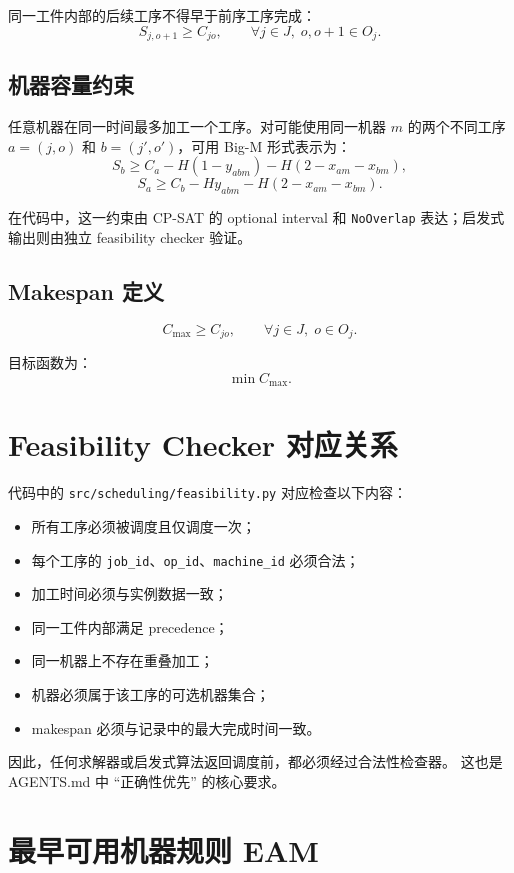 ﻿\documentclass[11pt]{ctexart}
\begin{document}
同一工件内部的后续工序不得早于前序工序完成：
\[
S_{j,o+1} \ge C_{jo},
\qquad \forall j \in J,\; o,o+1 \in O_j.
\]

\subsection{机器容量约束}

任意机器在同一时间最多加工一个工序。对可能使用同一机器 $m$ 的两个不同工序
$a=(j,o)$ 和 $b=(j',o')$，可用 Big-M 形式表示为：
\[
S_b \ge C_a - H(1-y_{abm}) - H(2-x_{am}-x_{bm}),
\]
\[
S_a \ge C_b - Hy_{abm} - H(2-x_{am}-x_{bm}).
\]

在代码中，这一约束由 CP-SAT 的 optional interval 和 \texttt{NoOverlap}
表达；启发式输出则由独立 feasibility checker 验证。

\subsection{Makespan 定义}

\[
C_{\max} \ge C_{jo},
\qquad \forall j \in J,\; o \in O_j.
\]

目标函数为：
\[
\min C_{\max}.
\]

\section{Feasibility Checker 对应关系}

代码中的 \texttt{src/scheduling/feasibility.py} 对应检查以下内容：

\begin{itemize}
  \item 所有工序必须被调度且仅调度一次；
  \item 每个工序的 \texttt{job\_id}、\texttt{op\_id}、\texttt{machine\_id} 必须合法；
  \item 加工时间必须与实例数据一致；
  \item 同一工件内部满足 precedence；
  \item 同一机器上不存在重叠加工；
  \item 机器必须属于该工序的可选机器集合；
  \item makespan 必须与记录中的最大完成时间一致。
\end{itemize}

因此，任何求解器或启发式算法返回调度前，都必须经过合法性检查器。
这也是 AGENTS.md 中 ``正确性优先'' 的核心要求。

\section{最早可用机器规则 EAM}
\end{document}
